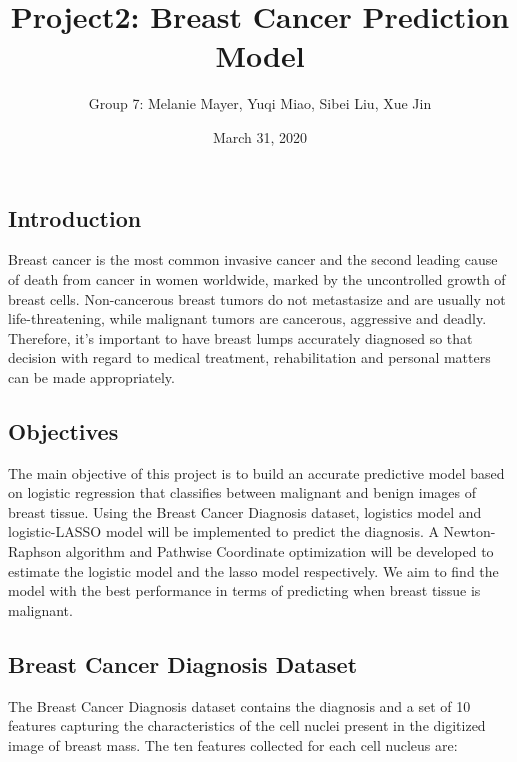 \documentclass[]{article}
\title{Project2: Breast Cancer Prediction Model}
\author{Group 7: Melanie Mayer, Yuqi Miao, Sibei Liu, Xue Jin}
\date{March 31, 2020}
\begin{document}
\maketitle

\hypertarget{introduction}{%
\subsection{Introduction}\label{introduction}}

Breast cancer is the most common invasive cancer and the second leading
cause of death from cancer in women worldwide, marked by the
uncontrolled growth of breast cells. Non-cancerous breast tumors do not
metastasize and are usually not life-threatening, while malignant tumors
are cancerous, aggressive and deadly. Therefore, it's important to have
breast lumps accurately diagnosed so that decision with regard to
medical treatment, rehabilitation and personal matters can be made
appropriately.

\hypertarget{objectives}{%
\subsection{Objectives}\label{objectives}}

The main objective of this project is to build an accurate predictive
model based on logistic regression that classifies between malignant and
benign images of breast tissue. Using the Breast Cancer Diagnosis
dataset, logistics model and logistic-LASSO model will be implemented to
predict the diagnosis. A Newton-Raphson algorithm and Pathwise
Coordinate optimization will be developed to estimate the logistic model
and the lasso model respectively. We aim to find the model with the best
performance in terms of predicting when breast tissue is malignant.

\hypertarget{breast-cancer-diagnosis-dataset}{%
\subsection{Breast Cancer Diagnosis
Dataset}\label{breast-cancer-diagnosis-dataset}}

The Breast Cancer Diagnosis dataset contains the diagnosis and a set of
10 features capturing the characteristics of the cell nuclei present in
the digitized image of breast mass. The ten features collected for each
cell nucleus are:
\end{document}
